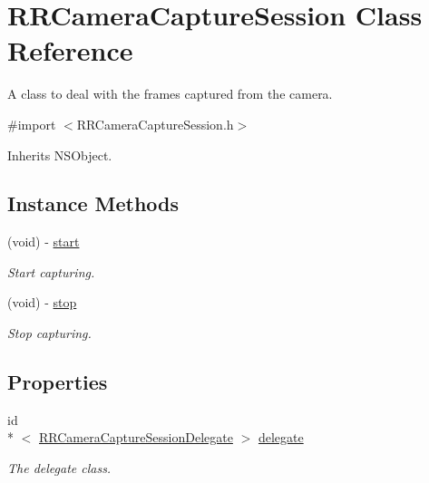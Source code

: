 \hypertarget{interface_r_r_camera_capture_session}{\section{R\-R\-Camera\-Capture\-Session Class Reference}
\label{interface_r_r_camera_capture_session}
}


A class to deal with the frames captured from the camera.  




{\ttfamily \#import $<$R\-R\-Camera\-Capture\-Session.\-h$>$}



Inherits N\-S\-Object.

\subsection*{Instance Methods}
\begin{DoxyCompactItemize}
\item 
(void) -\/ \hyperlink{interface_r_r_camera_capture_session_a1fa090ac21b03883e9ca5f3c7a05f800}{start}
\begin{DoxyCompactList}\small\item\em Start capturing. \end{DoxyCompactList}\item 
\hypertarget{interface_r_r_camera_capture_session_a8f26c10091d1e9b62452050bf35941fd}{(void) -\/ \hyperlink{interface_r_r_camera_capture_session_a8f26c10091d1e9b62452050bf35941fd}{stop}}\label{interface_r_r_camera_capture_session_a8f26c10091d1e9b62452050bf35941fd}

\begin{DoxyCompactList}\small\item\em Stop capturing. \end{DoxyCompactList}\end{DoxyCompactItemize}
\subsection*{Properties}
\begin{DoxyCompactItemize}
\item 
id\\*
$<$ \hyperlink{protocol_r_r_camera_capture_session_delegate-p}{R\-R\-Camera\-Capture\-Session\-Delegate} $>$ \hyperlink{interface_r_r_camera_capture_session_af9120ded793c65c489620efa5e9601c1}{delegate}
\begin{DoxyCompactList}\small\item\em The delegate class. \end{DoxyCompactList}\end{DoxyCompactItemize}


